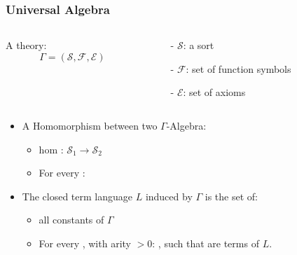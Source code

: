 \documentclass[t,10pt,numbers,fleqn,usenames,xcolor=dvipsnames]{beamer}
\begin{document}
\begin{frame}[fragile]
\frametitle{Universal Algebra}  
\begin{columns}
\begin{column}{0.2\textwidth}
A theory: \newline 
\[\Gamma = (\mathcal{S},\mathcal{F},\mathcal{E}) \]
\end{column}
\begin{column}{0.45\textwidth} 
\begin{itemize}
\item[-] $\mathcal{S}$: a sort
\item[-] $\mathcal{F}$: set of function symbols
\item[-] $\mathcal{E}$: set of axioms
\end{itemize}
\end{column} 
\end{columns} 
\pause
\vspace{0.5cm}
\begin{itemize}
\item A Homomorphism between two $\Gamma$-Algebra:  
\begin{itemize}
\item hom : $\mathcal{S}_1 \to \mathcal{S}_2$ 
\item For every : \newline  
\end{itemize}
\vspace{0.5cm}
\item The closed term language $L$ induced by $\Gamma$ is the set of: 
\begin{itemize}
\item all constants of $\Gamma$  
\item For every , with arity $> 0$: \newline 
, such that  are terms of $L$.
\end{itemize}

\end{itemize}
\end{frame}
\end{document}
